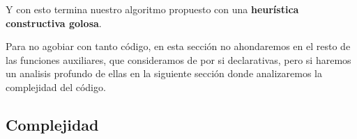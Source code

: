 Y con esto termina nuestro algoritmo propuesto con una \textbf{heurística constructiva golosa}.

Para no agobiar con tanto código, en esta sección no ahondaremos en el resto de las funciones auxiliares, que consideramos de por si declarativas, pero si haremos un analisis profundo de ellas en la siguiente sección donde analizaremos la complejidad del código.


\subsection{Complejidad}